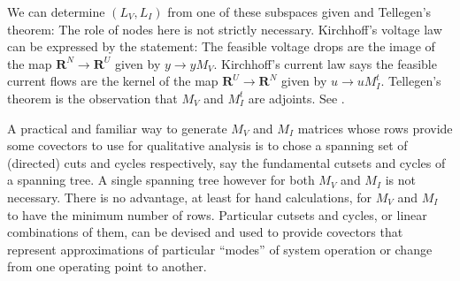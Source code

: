 \documentclass{amsproc-sunycstr}
\def\Reals{\ensuremath{\mathbf R}}
\theoremstyle{plain}
\theoremstyle{definition}
\theoremstyle{remark}
\newcommand{\extra}[1]{{{#1}}}
\begin{document}
\extra{ 
We can determine
$(L_V, L_I)$ from one of these subspaces given and Tellegen's theorem: The
role of nodes here is not strictly necessary.
Kirchhoff's voltage law can be expressed by the statement:  
The feasible voltage drops are the image of the map 
$\Reals^N\rightarrow\Reals^U$ given by $y\rightarrow y M_V$.  
Kirchhoff's current law says the feasible current flows are the kernel
of the map $\Reals^U\rightarrow\Reals^N$ given by $u\rightarrow u M_I^t$.
Tellegen's theorem is the observation that $M_V$ and $M_I^t$ are adjoints.
See \cite{WyattTele}.}

\extra{
A practical and familiar way to generate $M_V$ and $M_I$ matrices whose rows 
provide some covectors to use for qualitative analysis is to 
chose a spanning set of (directed) cuts and cycles respectively, say
the fundamental cutsets and cycles of a spanning tree.  A single spanning
tree however
for both $M_V$ and $M_I$ is not necessary.  There is no advantage, at 
least for hand calculations, for $M_V$ and $M_I$ to have the minimum
number of rows.  Particular cutsets and cycles, or linear combinations of
them, can be devised and used to provide covectors that represent
approximations of particular ``modes'' of system operation or change 
from one operating point to another.}
\end{document}
